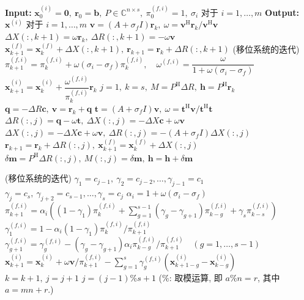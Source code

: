 \begin{algorithm}[H]\caption{{移位 IDR($s$) 方法 (种子系统: $(A+\sigma_f I)\bm x=\bm b$)}}\label{alg:shifted-idr}\begin{algorithmic}[1]
\Statex\textbf{Input:} $\bm x_0^{(i)}=\bm0,\ \bm r_0=\bm b,\ P\in\mathbb C^{n\times s},\ \pi_0^{(f,i)}=1,\ \sigma_i$ {对于} $i=1,\ldots,m$
\Statex\textbf{Output:} $\bm x^{(i)}$ {对于} $i=1,\ldots,m$
\State $\bm v=(A+\sigma_f I)\bm r_k,\ \omega=\bm v^{\mathrm H}\bm r_k/\bm v^{\mathrm H}\bm v$
\State $\Delta X(:,k+1)=\omega\bm r_k,\ \Delta R(:,k+1)=-\omega\bm v$
\State $\bm x_{k+1}^{(f)}=\bm x_k^{(f)}+\Delta X(:,k+1),\ \bm r_{k+1}=\bm r_k+\Delta R(:,k+1)$
\State ({移位系统的迭代})
\State $\pi_{k+1}^{(f,i)}=\pi_k^{(f,i)}+\omega(\sigma_i-\sigma_f)\pi_k^{(f,i)},\quad\omega^{(f,i)}=\dfrac{\omega}{1+\omega(\sigma_i-\sigma_f)}$
\State $\bm x_{k+1}^{(i)}=\bm x_k^{(i)}+\dfrac{\omega^{(f,i)}}{\pi_k^{(f,i)}}\bm r_k$
\EndIf\EndFor\EndFor
\State $j=1,\ k=s,\ M=P^{\mathrm H}\Delta R,\ \bm h=P^{\mathrm H}\bm r_k$
\State $\bm q=-\Delta R\bm c,\ \bm v=\bm r_k+\bm q$
\State $\bm t=(A+\sigma_f I)\bm v,\ \omega=\bm t^{\mathrm H}\bm v/\bm t^{\mathrm H}\bm t$
\State $\Delta R(:,j)=\bm q-\omega\bm t,\ \Delta X(:,j)=-\Delta X\bm c+\omega\bm v$
\Else
\State $\Delta X(:,j)=-\Delta X\bm c+\omega\bm v,\ \Delta R(:,j)=-(A+\sigma_f I)\Delta X(:,j)$
\EndIf
\State $\bm r_{k+1}=\bm r_k+\Delta R(:,j),\ \bm x_{k+1}^{(f)}=\bm x_k^{(f)}+\Delta X(:,j)$
\State $\delta\bm m=P^{\mathrm H}\Delta R(:,j),\ M(:,j)=\delta\bm m,\ \bm h=\bm h+\delta\bm m$
\end{algorithmic}\end{algorithm}
\begin{algorithm}[H]\ContinuedFloat\caption[]{{移位 IDR($s$) 方法 (续)}}\begin{algorithmic}[1]
\State ({移位系统的迭代})
\State $\gamma_1=c_{j-1},\ \gamma_2=c_{j-2},\ldots,\gamma_{j-1}=c_1$
\State $\gamma_j=c_s,\ \gamma_{j+2}=c_{s-1},\ldots,\gamma_s=c_j$
\State $\alpha_i=1+\omega(\sigma_i-\sigma_f)$
\State $\pi_{k+1}^{(f,i)}=\alpha_i\left((1-\gamma_1)\pi_k^{(f,i)}+\sum_{g=1}^{s-1}(\gamma_g-\gamma_{g+1})\pi_{k-g}^{(f,i)}+\gamma_s\pi_{k-s}^{(f,i)}\right)$
\State $\gamma_1^{(f,i)}=1-\alpha_i(1-\gamma_1)\pi_k^{(f,i)}/\pi_{k+1}^{(f,i)}$
\State $\gamma_{g+1}^{(f,i)}=\gamma_g^{(f,i)}-(\gamma_g-\gamma_{g+1})\alpha_i\pi_{k-g}^{(f,i)}/\pi_{k+1}^{(f,i)}\quad(g=1,\ldots,s-1)$
\State $\bm x_{k+1}^{(i)}=\bm x_k^{(i)}+\omega\bm v/\pi_{k+1}^{(f,i)}-\sum_{g=1}^{s}\gamma_g^{(f,i)}(\bm x_{k+1-g}^{(i)}-\bm x_{k-g}^{(i)})$
\EndIf\EndFor
\State $k=k+1,\ j=j+1$
\State $j=(j-1)\%s+1$ {($\%$: 取模运算, 即 $a\%n=r$, 其中 $a=mn+r$.)}
\EndFor\EndWhile\end{algorithmic}\end{algorithm}
